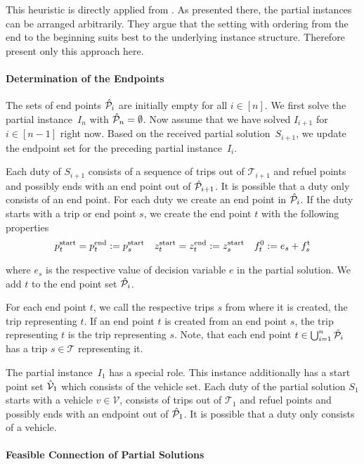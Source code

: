 This heuristic is directly applied from \cite[Sec. 10.4]{Knoll}. As presented there, the partial instances can be arranged arbitrarily. They argue that the setting with ordering from the end to the beginning suits best to the underlying instance structure. Therefore present only this approach here.

\paragraph{Determination of the Endpoints} \parfill

The sets of end points $\hat{\mathcal{P}}_i$ are initially empty for all $i\in[n]$. We first solve the partial instance~$I_n$ with ${\hat{\mathcal{P}}_n = \emptyset}$. Now assume that we have solved $I_{i+1}$ for $i\in[n-1]$ right now. Based on the received partial solution~$S_{i+1}$, we update the endpoint set for the preceding partial instance~$I_i$.

Each duty of $S_{i+1}$ consists of a sequence of trips out of $\mathcal{T}_{i+1}$ and refuel points and possibly ends with an end point out of $\hat{\mathcal{P}}_{i+1}$. It is possible that a duty only consists of an end point. For each duty we create an end point in $\hat{\mathcal{P}}_i$. If the duty starts with a trip or end point $s$, we create the end point $t$ with the following properties
\begin{align*}
	p^{\operatorname{start}}_t = p^{\operatorname{end}}_t := p^{\operatorname{start}}_s && z^{\operatorname{start}}_t = z^{\operatorname{end}}_t := z^{\operatorname{start}}_s && f_t^0 := e_s + f^{\operatorname{t}}_s
\end{align*}

where $e_s$ is the respective value of decision variable $e$ in the partial solution. We add $t$ to the end point set $\hat{\mathcal{P}}_i$.

For each end point $t$, we call the respective trips $s$ from where it is created, the trip representing $t$. If an end point $t$ is created from an end point $s$, the trip representing $t$ is the trip representing $s$. Note, that each end point ${t\in\bigcup_{i=1}^n\hat{\mathcal{P}}_i}$ has a trip ${s\in\mathcal{T}}$ representing it.

The partial instance~$I_1$ has a special role. This instance additionally has a start point set $\hat{\mathcal{V}}_1$ which consists of the vehicle set. Each duty of the partial solution $S_1$ starts with a vehicle $v\in\mathcal{V}$, consists of trips out of $\mathcal{T}_1$ and refuel points and possibly ends with an endpoint out of $\hat{\mathcal{P}}_1$. It is possible that a duty only consists of a vehicle.

\paragraph{Feasible Connection of Partial Solutions} \parfill

